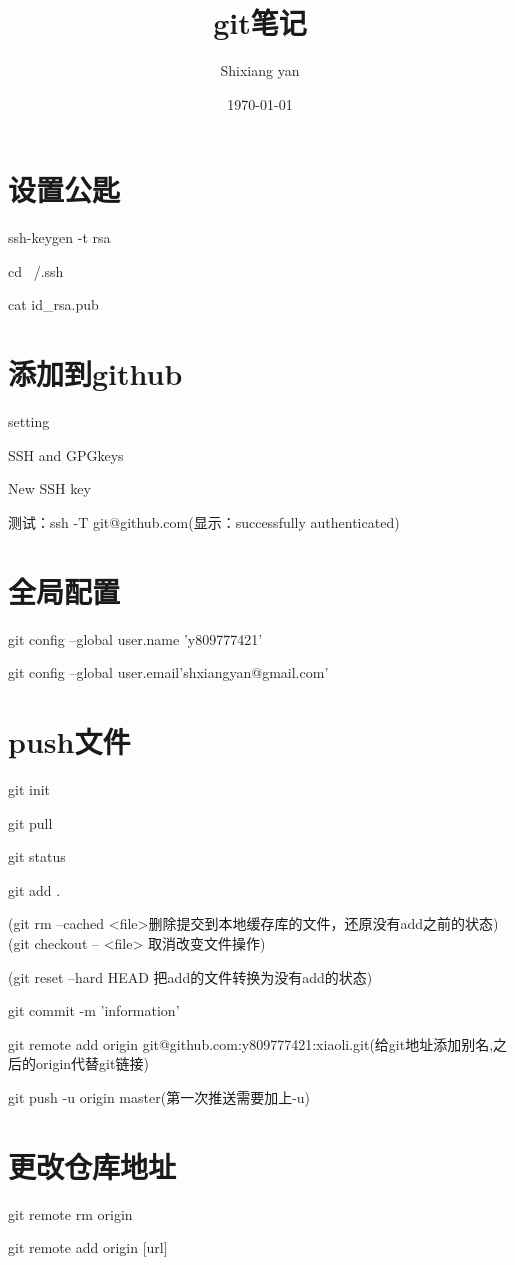 \documentclass{article}
\title{git笔记}
\author{Shixiang yan}
\date{\today}
\begin{document}
	\maketitle
	\section{设置公匙}
	ssh-keygen -t rsa
	
	cd ~/.ssh
	
	cat id\_rsa.pub
	\section{添加到github}
	setting
	
	SSH and GPGkeys
	
	New SSH key
	
	测试：ssh -T git@github.com(显示：successfully authenticated)
	\section{全局配置}
	git config --global user.name 'y809777421'
	
	git config --global user.email'shxiangyan@gmail.com'
	\section{push文件}
	
	git init
	
	git pull
	
	git status
	
	git add .

        (git rm --cached <file>删除提交到本地缓存库的文件，还原没有add之前的状态)
        (git checkout -- <file> 取消改变文件操作)
        
        (git reset --hard HEAD 把add的文件转换为没有add的状态)


        git commit -m 'information'

	
	git remote add origin git@github.com:y809777421:xiaoli.git(给git地址添加别名,之后的origin代替git链接)
	
	git push -u origin master(第一次推送需要加上-u)
	
	\section{更改仓库地址}
	git remote rm origin
	
	git remote add origin [url]
\end{document}
